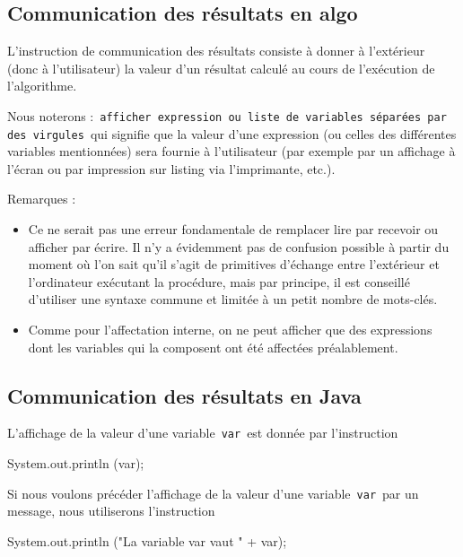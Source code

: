 \documentclass[11pt,a4paper]{article}
\begin{document}
            \par
        \subsection{Communication des r\'esultats en algo}
          L'instruction de communication des r\'esultats consiste \`a donner \`a l'ext\'erieur (donc \`a l'utilisateur) 
          la valeur d'un r\'esultat calcul\'e au cours de l'ex\'ecution de l'algorithme.
        
            \par
        
          Nous noterons :
          \,\verb|afficher expression ou liste de variables séparées par des virgules|\,
          qui signifie que la valeur d'une expression (ou celles des diff\'erentes variables mentionn\'ees) 
          sera fournie \`a l'utilisateur (par exemple par un affichage \`a l'\'ecran ou par impression sur
          listing via l'imprimante, etc.).
          
            \par
        
          Remarques :
          
					\begin{itemize}
				
			\item 
              Ce ne serait pas une erreur fondamentale de remplacer lire par recevoir ou afficher
              par \'ecrire. Il n'y a \'evidemment pas de confusion possible \`a partir du moment o\`u l'on
              sait qu'il s'agit de primitives d'\'echange entre l'ext\'erieur et l'ordinateur ex\'ecutant la
              proc\'edure, mais par principe, il est conseill\'e d'utiliser une syntaxe commune et limit\'ee
              \`a un petit nombre de mots-cl\'es.
            
			\item 
              Comme pour l'affectation interne, on ne peut afficher que des expressions dont les
              variables qui la composent ont \'et\'e affect\'ees pr\'ealablement.
            
					\end{itemize}
				
            \par
        \subsection{Communication des r\'esultats en Java}
          L'affichage de la valeur d'une variable \,\verb|var|\,  est donn\'ee par l'instruction
          
            \par
        \begin{Java}
 System.out.println (var);
				\end{Java}
          Si nous voulons pr\'ec\'eder l'affichage de la valeur d'une variable \,\verb|var|\,  par un message, 
          nous utiliserons l'instruction
        
            \par
        \begin{Java}
 System.out.println ("La variable var vaut " + var);
				\end{Java}
				
\end{document}

